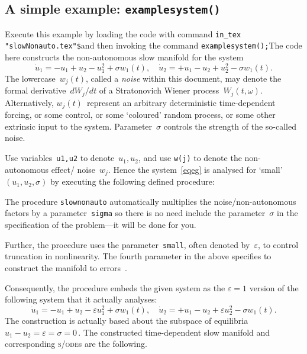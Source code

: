 \documentclass[11pt,a5paper]{article}
\def\eps{\ensuremath{\varepsilon}}
\def\sde{\textsc{s/ode}}
\begin{document}
\subsection{A simple example: \texttt{examplesystem()}} 
\label{ss:eg}
Execute this example by loading the code with command
\verb|in_tex "slowNonauto.tex"$|\quad and then invoking the
command \verb|examplesystem();|\quad  The code here
constructs the non-autonomous slow manifold for the system
\begin{equation}
\dot u_1=-u_1+u_2-u_1^2+\sigma w_1(t), \quad
\dot u_2=+u_1-u_2+u_2^2-\sigma w_1(t).
\label{eqeg}
\end{equation}
The lowercase~$w_j(t)$, called a \emph{noise} within this
document, may denote the formal derivative~$dW_j/dt$ of a
Stratonovich Wiener process~$W_j(t,\omega)$. Alternatively,
\(w_j(t)\)~represent an arbitrary deterministic
time-dependent forcing, or some control, or some `coloured'
random process, or some other extrinsic input to the system.
Parameter~$\sigma$ controls the strength of the so-called
noise.

Use variables~\verb|u1,u2| to denote~\(u_1,u_2\), and use
\verb|w(j)| to denote the non-autonomous effect\slash
noise~$w_j$.  Hence the system~\cref{eqeg} is analysed for
`small'~\((u_1,u_2,\sigma)\) by executing the following
defined procedure:
The procedure \verb|slownonauto| automatically multiplies
the noise\slash non-autonomous factors by a
parameter~\verb|sigma| so there is no need include the
parameter~$\sigma$ in the specification of the problem---it
will be done for you.

Further, the procedure uses the parameter~\verb|small|, often
denoted by~\(\eps\), to control truncation in nonlinearity. 
The fourth parameter in the above specifies to construct the
manifold to errors~\Ord{\eps^3}.

Consequently, the procedure embeds the given system as the
\(\eps=1\) version of the following system that it actually
analyses:
\begin{equation}
\dot u_1=-u_1+u_2-\eps u_1^2+\sigma w_1(t), \quad
\dot u_2=+u_1-u_2+\eps u_2^2-\sigma w_1(t).
\label{eqem}
\end{equation}
The construction is actually based about the subspace of
equilibria \(u_1-u_2=\eps=\sigma=0\)\,.  The constructed
time-dependent slow manifold and corresponding \sde{}s are the
following.
\end{document}
